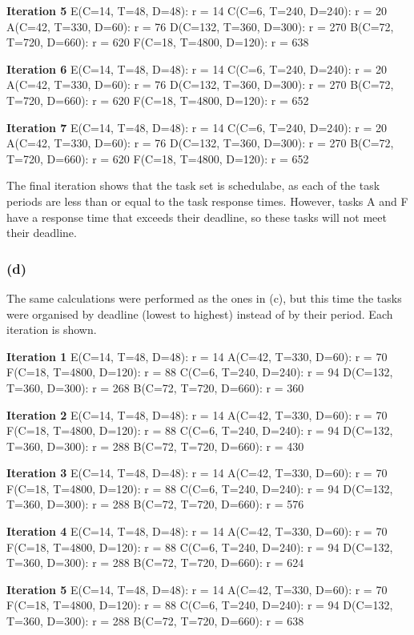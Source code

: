 \documentclass[]{report}
\begin{document}
		\textbf{Iteration 5}
		E(C=14, T=48, D=48): r = 14
		C(C=6, T=240, D=240): r = 20
		A(C=42, T=330, D=60): r = 76
		D(C=132, T=360, D=300): r = 270
		B(C=72, T=720, D=660): r = 620
		F(C=18, T=4800, D=120): r = 638

		\textbf{Iteration 6}
		E(C=14, T=48, D=48): r = 14
		C(C=6, T=240, D=240): r = 20
		A(C=42, T=330, D=60): r = 76
		D(C=132, T=360, D=300): r = 270
		B(C=72, T=720, D=660): r = 620
		F(C=18, T=4800, D=120): r = 652

		\textbf{Iteration 7}
		E(C=14, T=48, D=48): r = 14
		C(C=6, T=240, D=240): r = 20
		A(C=42, T=330, D=60): r = 76
		D(C=132, T=360, D=300): r = 270
		B(C=72, T=720, D=660): r = 620
		F(C=18, T=4800, D=120): r = 652
			
			The final iteration shows that the task set is schedulabe, as each of the task periods are less than or equal to the task response times. However, tasks A and F have a response time that exceeds their deadline, so these tasks will not meet their deadline.
			
			
			
			\subsubsection{(d)}
			The same calculations were performed as the ones in (c), but this time the tasks were organised by deadline (lowest to highest) instead of by their period. Each iteration is shown.

			\textbf{Iteration 1}
			E(C=14, T=48, D=48): r = 14
			A(C=42, T=330, D=60): r = 70
			F(C=18, T=4800, D=120): r = 88
			C(C=6, T=240, D=240): r = 94
			D(C=132, T=360, D=300): r = 268
			B(C=72, T=720, D=660): r = 360

			\textbf{Iteration 2}
			E(C=14, T=48, D=48): r = 14
			A(C=42, T=330, D=60): r = 70
			F(C=18, T=4800, D=120): r = 88
			C(C=6, T=240, D=240): r = 94
			D(C=132, T=360, D=300): r = 288
			B(C=72, T=720, D=660): r = 430

			\textbf{Iteration 3}
			E(C=14, T=48, D=48): r = 14
			A(C=42, T=330, D=60): r = 70
			F(C=18, T=4800, D=120): r = 88
			C(C=6, T=240, D=240): r = 94
			D(C=132, T=360, D=300): r = 288
			B(C=72, T=720, D=660): r = 576


			\textbf{Iteration 4}
			E(C=14, T=48, D=48): r = 14
			A(C=42, T=330, D=60): r = 70
			F(C=18, T=4800, D=120): r = 88
			C(C=6, T=240, D=240): r = 94
			D(C=132, T=360, D=300): r = 288
			B(C=72, T=720, D=660): r = 624

			\textbf{Iteration 5}
			E(C=14, T=48, D=48): r = 14
			A(C=42, T=330, D=60): r = 70
			F(C=18, T=4800, D=120): r = 88
			C(C=6, T=240, D=240): r = 94
			D(C=132, T=360, D=300): r = 288
			B(C=72, T=720, D=660): r = 638
\end{document}
